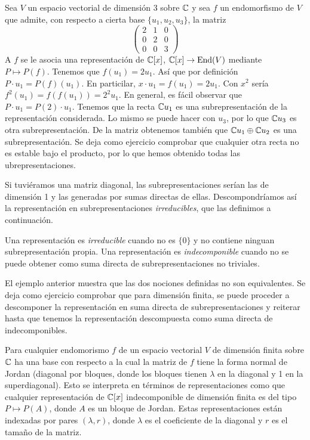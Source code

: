 \documentclass[ANAyTR.tex]{subfiles}
\begin{document}
\begin{ej}
Sea $V$ un espacio vectorial de dimensión 3 sobre $\mathbb{C}$ y sea $f$ un endomorfismo de $V$ que admite, con respecto a cierta base $\{u_1,u_2,u_3\}$, la matriz
\[
\begin{pmatrix}
2 & 1 & 0\\
0 & 2 & 0\\
0 & 0 & 3 
\end{pmatrix}
\]
A $f$ se le asocia una representación de $\mathbb{C}[x]$, $\mathbb{C}[x]\to\operatorname{End}(V)$ mediante $P\mapsto P(f)$. Tenemos que $f(u_1)=2u_1$. Así que por definición $P\cdot u_1=P(f)(u_1)$. En particilar, $x\cdot u_1=f(u_1)=2u_1$. Con $x^2$ sería $f^2(u_1)=f(f(u_1))=2^2u_1$. En general, es fácil observar que $P\cdot u_1=P(2)\cdot u_1$. Tenemos que la recta $\mathbb{C} u_1$ es una subrepresentación de la representación considerada. Lo mismo se puede hacer con $u_3$, por lo que $\mathbb{C} u_3$ es otra subrepresentación. De la matriz obtenemos también que $\mathbb{C} u_1\oplus \mathbb{C} u_2$ es una subrepresentación. Se deja como ejercicio comprobar que cualquier otra recta no es estable bajo el producto, por lo que hemos obtenido todas las ubrepresentaciones. 

Si tuviéramos una matriz diagonal, las subrepresentaciones serían las de dimensión 1 y las generadas por sumas directas de ellas. Descompondríamos así la representación en subrepresentaciones \emph{irreducibles}, que las definimos a continuación.
\end{ej}

\begin{defi}
Una representación es \emph{irreducible} cuando no es $\{0\}$ y no contiene ninguan subrepresentación propia. Una representación es \emph{indecomponible} cuando no se puede obtener como suma directa de subrepresentaciones no triviales. 
\end{defi}

El ejemplo anterior muestra que las dos nociones definidas no son equivalentes. Se deja como ejercicio comprobar que para dimensión finita, se puede proceder a descomponer la representación en suma directa de subrepresentaciones y reiterar hasta que tenemos la representación descompuesta como suma directa de indecomponibles. 

Para cualquier endomorismo $f$ de un espacio vectorial $V$ de dimensión finita sobre $\mathbb{C}$ ha una base con respecto a la cual la matriz de $f$ tiene la forma normal de Jordan (diagonal por bloques, donde los bloques tienen $\lambda$ en la diagonal y 1 en la superdiagonal). Esto se interpreta en términos de representaciones como que cualquier representación de $\mathbb{C}[x]$ indecomponible de dimensión finita es del tipo $P\mapsto P(A)$, donde $A$ es un bloque de Jordan. Estas representaciones están indexadas por pares $(\lambda,r)$, donde $\lambda$ es el coeficiente de la diagonal y $r$ es el tamaño de la matriz. 
\end{document}
